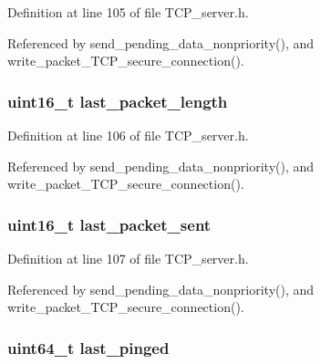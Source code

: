 Definition at line 105 of file T\+C\+P\+\_\+server.\+h.



Referenced by send\+\_\+pending\+\_\+data\+\_\+nonpriority(), and write\+\_\+packet\+\_\+\+T\+C\+P\+\_\+secure\+\_\+connection().

\hypertarget{struct_t_c_p___secure___connection_a78d503fe4c8d935701480b58a0461775}{
\subsubsection[{last\+\_\+packet\+\_\+length}]{\setlength{\rightskip}{0pt plus 5cm}uint16\+\_\+t last\+\_\+packet\+\_\+length}}\label{struct_t_c_p___secure___connection_a78d503fe4c8d935701480b58a0461775}


Definition at line 106 of file T\+C\+P\+\_\+server.\+h.



Referenced by send\+\_\+pending\+\_\+data\+\_\+nonpriority(), and write\+\_\+packet\+\_\+\+T\+C\+P\+\_\+secure\+\_\+connection().

\hypertarget{struct_t_c_p___secure___connection_a80b55fa7d5b8e4c3de6b51c99d7670cc}{
\subsubsection[{last\+\_\+packet\+\_\+sent}]{\setlength{\rightskip}{0pt plus 5cm}uint16\+\_\+t last\+\_\+packet\+\_\+sent}}\label{struct_t_c_p___secure___connection_a80b55fa7d5b8e4c3de6b51c99d7670cc}


Definition at line 107 of file T\+C\+P\+\_\+server.\+h.



Referenced by send\+\_\+pending\+\_\+data\+\_\+nonpriority(), and write\+\_\+packet\+\_\+\+T\+C\+P\+\_\+secure\+\_\+connection().

\hypertarget{struct_t_c_p___secure___connection_a4049204f6c392628d31be6c39f03e031}{
\subsubsection[{last\+\_\+pinged}]{\setlength{\rightskip}{0pt plus 5cm}uint64\+\_\+t last\+\_\+pinged}}\label{struct_t_c_p___secure___connection_a4049204f6c392628d31be6c39f03e031}


